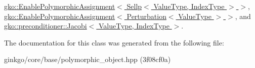 \hyperlink{classgko_1_1EnablePolymorphicAssignment_a0a4cf244139e7761d6a91c61e029810e}{gko\+::\+Enable\+Polymorphic\+Assignment$<$ Sellp$<$ Value\+Type, Index\+Type $>$ $>$}, \hyperlink{classgko_1_1EnablePolymorphicAssignment_a0a4cf244139e7761d6a91c61e029810e}{gko\+::\+Enable\+Polymorphic\+Assignment$<$ Perturbation$<$ Value\+Type $>$ $>$}, and \hyperlink{classgko_1_1preconditioner_1_1Jacobi_a6d5e28b3033772bfc6c96fbe3caca003}{gko\+::preconditioner\+::\+Jacobi$<$ Value\+Type, Index\+Type $>$}.



The documentation for this class was generated from the following file\+:\begin{DoxyCompactItemize}
\item 
ginkgo/core/base/polymorphic\+\_\+object.\+hpp (3f08cf0a)\end{DoxyCompactItemize}
